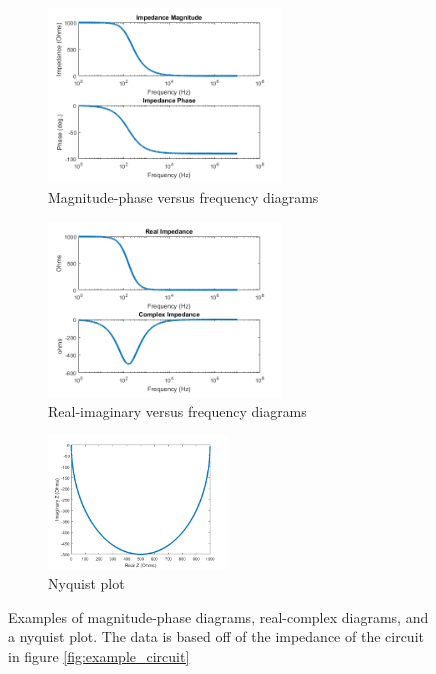  \begin{figure}
    \centering
    \begin{subfigure}[b]{\textwidth}
        \centering
        \includegraphics[width=0.68\textwidth]{images/magPhaseExample.png}
        \caption{Magnitude-phase versus frequency diagrams}
        \label{fig:mag_phase_ex}
    \end{subfigure}
 
    \begin{subfigure}[b]{\textwidth}
        \centering
        \includegraphics[width=0.68\textwidth]{images/complexRealExample.png}
        \caption{Real-imaginary versus frequency diagrams}
        \label{fig:real_complex_ex}
    \end{subfigure}
    \begin{subfigure}[b]{\textwidth}
        \centering
        \includegraphics[width=0.52\textwidth]{images/nyquistExample.png}
        \caption{Nyquist plot}
        \label{fig:nyquist_plot}
    \end{subfigure}
    \caption[Impedance Diagrams]{Examples of magnitude-phase diagrams, real-complex diagrams, and a nyquist plot. The data is based off of the impedance of the circuit in figure \ref{fig:example_circuit}}
    \label{fig:impedance_diagrams}
\end{figure}


